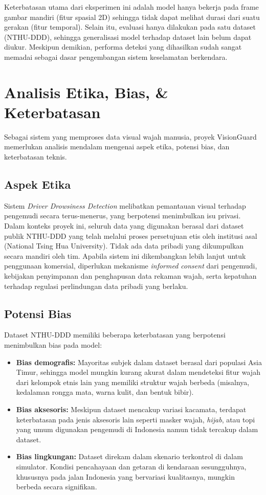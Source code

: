 \documentclass[11pt,a4paper,oneside]{report}
\begin{document}
Keterbatasan utama dari eksperimen ini adalah model hanya bekerja pada frame gambar mandiri (fitur spasial 2D) sehingga tidak dapat melihat durasi dari suatu gerakan (fitur temporal). Selain itu, evaluasi hanya dilakukan pada satu dataset (NTHU-DDD), sehingga generalisasi model terhadap dataset lain belum dapat diukur. Meskipun demikian, performa deteksi yang dihasilkan sudah sangat memadai sebagai dasar pengembangan sistem keselamatan berkendara.

\section{Analisis Etika, Bias, \& Keterbatasan}

Sebagai sistem yang memproses data visual wajah manusia, proyek VisionGuard memerlukan analisis mendalam mengenai aspek etika, potensi bias, dan keterbatasan teknis.

\subsection*{Aspek Etika}

Sistem \textit{Driver Drowsiness Detection} melibatkan pemantauan visual terhadap pengemudi secara terus-menerus, yang berpotensi menimbulkan isu privasi. Dalam konteks proyek ini, seluruh data yang digunakan berasal dari dataset publik NTHU-DDD yang telah melalui proses persetujuan etis oleh institusi asal (National Tsing Hua University). Tidak ada data pribadi yang dikumpulkan secara mandiri oleh tim. Apabila sistem ini dikembangkan lebih lanjut untuk penggunaan komersial, diperlukan mekanisme \textit{informed consent} dari pengemudi, kebijakan penyimpanan dan penghapusan data rekaman wajah, serta kepatuhan terhadap regulasi perlindungan data pribadi yang berlaku.

\subsection*{Potensi Bias}

Dataset NTHU-DDD memiliki beberapa keterbatasan yang berpotensi menimbulkan bias pada model:

\begin{itemize}[leftmargin=*]
    \item \textbf{Bias demografis:} Mayoritas subjek dalam dataset berasal dari populasi Asia Timur, sehingga model mungkin kurang akurat dalam mendeteksi fitur wajah dari kelompok etnis lain yang memiliki struktur wajah berbeda (misalnya, kedalaman rongga mata, warna kulit, dan bentuk bibir).
    \item \textbf{Bias aksesoris:} Meskipun dataset mencakup variasi kacamata, terdapat keterbatasan pada jenis aksesoris lain seperti masker wajah, \textit{hijab}, atau topi yang umum digunakan pengemudi di Indonesia namun tidak tercakup dalam dataset.
    \item \textbf{Bias lingkungan:} Dataset direkam dalam skenario terkontrol di dalam simulator. Kondisi pencahayaan dan getaran di kendaraan sesungguhnya, khususnya pada jalan Indonesia yang bervariasi kualitasnya, mungkin berbeda secara signifikan.
\end{itemize}
\end{document}
